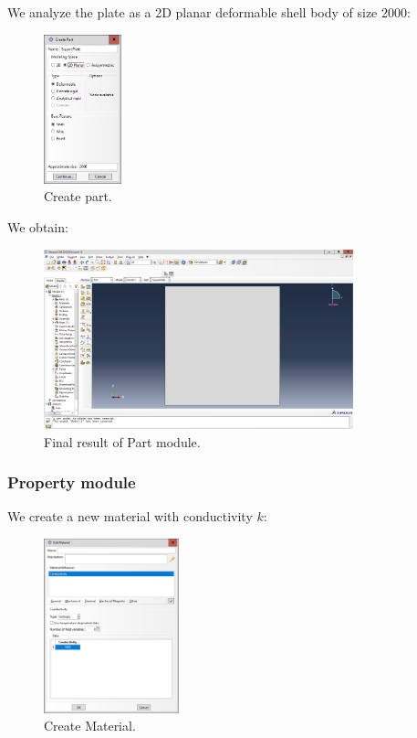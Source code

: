 We analyze the plate as a 2D planar deformable shell body of size 2000:
\begin{figure}[H]
    \centering
    \includegraphics[width=0.2\textwidth]{Images/ab2/ab1.png}
    \caption{Create part.}
    \label{fig:ab1}
\end{figure}

We obtain:
\begin{figure}[H]
    \centering
    \includegraphics[width=0.8\textwidth]{Images/ab2/ab2.png}
    \caption{Final result of Part module.}
    \label{fig:ab2}
\end{figure}

\subsubsection{Property module}

We create a new material with conductivity $k$:
\begin{figure}[H]
    \centering
    \includegraphics[width=0.35\textwidth]{Images/ab2/ab3.png}
    \caption{Create Material.}
    \label{fig:ab3}
\end{figure}

